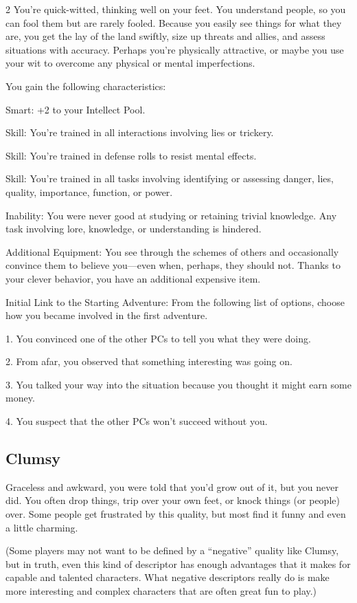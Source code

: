 \begin{multicols}{2}
You’re quick-witted, thinking well on your feet. You understand people, so you can fool them but are rarely fooled. Because you easily see things for what they are, you get the lay of the land swiftly, size up threats and allies, and assess situations with accuracy. Perhaps you’re physically attractive, or maybe you use your wit to overcome any physical or mental imperfections.

You gain the following characteristics:

Smart: +2 to your Intellect Pool.

Skill: You’re trained in all interactions involving lies or trickery.

Skill: You’re trained in defense rolls to resist mental effects.

Skill: You’re trained in all tasks involving identifying or assessing danger, lies, quality, importance, function, or power.

Inability: You were never good at studying or retaining trivial knowledge. Any task involving lore, knowledge, or understanding is hindered.

Additional Equipment: You see through the schemes of others and occasionally convince them to believe you—even when, perhaps, they should not. Thanks to your clever behavior, you have an additional expensive item.

Initial Link to the Starting Adventure: From the following list of options, choose how you became involved in the first adventure.

1. You convinced one of the other PCs to tell you what they were doing.

2. From afar, you observed that something interesting was going on.

3. You talked your way into the situation because you thought it might earn some money.

4. You suspect that the other PCs won’t succeed without you.

\subsection{Clumsy}

Graceless and awkward, you were told that you’d grow out of it, but you never did. You often drop things, trip over your own feet, or knock things (or people) over. Some people get frustrated by this quality, but most find it funny and even a little charming.

(Some players may not want to be defined by a “negative” quality like Clumsy, but in truth, even this kind of descriptor has enough advantages that it makes for capable and talented characters. What negative descriptors really do is make more interesting and complex characters that are often great fun to play.)


\end{multicols}
